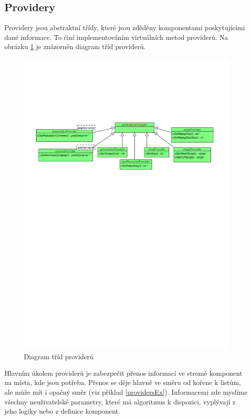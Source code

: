 \subsection{Providery}

Providery jsou abstraktní třídy, které jsou zděděny komponentami poskytujícími dané informace. To činí implementováním virtuálních metod providerů. Na obrázku \ref{providers} je znázorněn diagram tříd providerů.

\begin{figure}[h!]
  \includegraphics[width=\textwidth]{img/providers}
  \caption{Diagram tříd providerů}\label{providers}
\end{figure}

Hlavním úkolem providerů je zabezpečit přenos informací ve stromě komponent na místa, kde jsou potřeba. Přenos se děje hlavně ve směru od kořene k listům, ale může mít i opačný směr (viz příklad \ref{providersEx}). Informacemi zde myslíme všechny neuživatelské parametry, které má algoritmus k dispozici, vyplývají z jeho logiky nebo z definice komponent.

